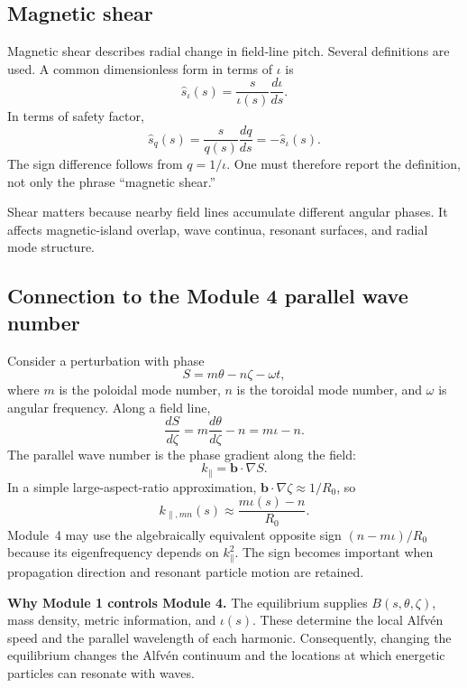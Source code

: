 \subsection{Magnetic shear}
Magnetic shear describes radial change in field-line pitch. Several definitions are used. A common dimensionless form in terms of $\iota$ is
\begin{equation}
\hat s_\iota(s)=\frac{s}{\iota(s)}\frac{d\iota}{ds}.
\label{eq:shear_iota}
\end{equation}
In terms of safety factor,
\begin{equation}
\hat s_q(s)=\frac{s}{q(s)}\frac{dq}{ds}=-\hat s_\iota(s).
\label{eq:shear_q}
\end{equation}
The sign difference follows from $q=1/\iota$. One must therefore report the definition, not only the phrase ``magnetic shear.''

Shear matters because nearby field lines accumulate different angular phases. It affects magnetic-island overlap, wave continua, resonant surfaces, and radial mode structure.

\subsection{Connection to the Module 4 parallel wave number}
Consider a perturbation with phase
\begin{equation}
S=m\theta-n\zeta-\omega t,
\label{eq:mode_phase}
\end{equation}
where $m$ is the poloidal mode number, $n$ is the toroidal mode number, and $\omega$ is angular frequency. Along a field line,
\begin{equation}
\frac{dS}{d\zeta}=m\frac{d\theta}{d\zeta}-n=m\iota-n.
\end{equation}
The parallel wave number is the phase gradient along the field:
\begin{equation}
k_\parallel=\mathbf b\cdot\nabla S.
\label{eq:kparallel_general}
\end{equation}
In a simple large-aspect-ratio approximation, $\mathbf b\cdot\nabla\zeta\approx1/R_0$, so
\begin{equation}
k_{\parallel,mn}(s)\approx\frac{m\iota(s)-n}{R_0}.
\label{eq:kparallel_simple}
\end{equation}
Module~4 may use the algebraically equivalent opposite sign $(n-m\iota)/R_0$ because its eigenfrequency depends on $k_\parallel^2$. The sign becomes important when propagation direction and resonant particle motion are retained.

\begin{physicsbox}
\textbf{Why Module 1 controls Module 4.} The equilibrium supplies $B(s,\theta,\zeta)$, mass density, metric information, and $\iota(s)$. These determine the local Alfv\'en speed and the parallel wavelength of each harmonic. Consequently, changing the equilibrium changes the Alfv\'en continuum and the locations at which energetic particles can resonate with waves.
\end{physicsbox}

